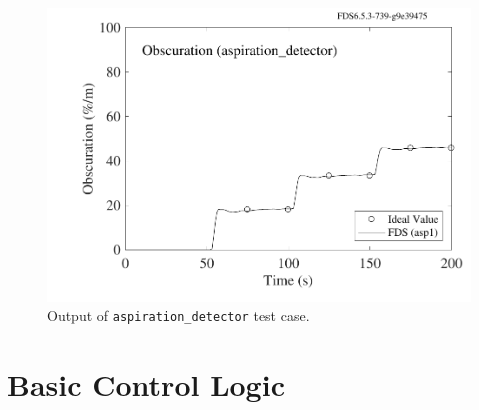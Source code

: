 \documentclass[11pt]{book}
\newcommand{\ct}{\tt\small}
\begin{document}
\begin{figure}[ht]
\begin{center}
\includegraphics[width=4.in]{SCRIPT_FIGURES/aspiration_detector}
\end{center}
\caption[Results of the {\ct aspiration\_detector} test case]{Output of {\ct aspiration\_detector} test case.}
\label{aspiration_detector}
\end{figure}





\clearpage

\section{Basic Control Logic}
\label{info:basic_control}
\end{document}
